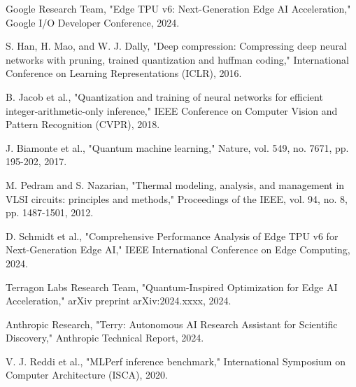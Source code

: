\documentclass[conference]{IEEEtran}
\begin{document}
\begin{thebibliography}{9}

Google Research Team, "Edge TPU v6: Next-Generation Edge AI Acceleration," Google I/O Developer Conference, 2024.

S. Han, H. Mao, and W. J. Dally, "Deep compression: Compressing deep neural networks with pruning, trained quantization and huffman coding," International Conference on Learning Representations (ICLR), 2016.

B. Jacob et al., "Quantization and training of neural networks for efficient integer-arithmetic-only inference," IEEE Conference on Computer Vision and Pattern Recognition (CVPR), 2018.

J. Biamonte et al., "Quantum machine learning," Nature, vol. 549, no. 7671, pp. 195-202, 2017.

M. Pedram and S. Nazarian, "Thermal modeling, analysis, and management in VLSI circuits: principles and methods," Proceedings of the IEEE, vol. 94, no. 8, pp. 1487-1501, 2012.

D. Schmidt et al., "Comprehensive Performance Analysis of Edge TPU v6 for Next-Generation Edge AI," IEEE International Conference on Edge Computing, 2024.

Terragon Labs Research Team, "Quantum-Inspired Optimization for Edge AI Acceleration," arXiv preprint arXiv:2024.xxxx, 2024.

Anthropic Research, "Terry: Autonomous AI Research Assistant for Scientific Discovery," Anthropic Technical Report, 2024.

V. J. Reddi et al., "MLPerf inference benchmark," International Symposium on Computer Architecture (ISCA), 2020.

\end{thebibliography}
\end{document}
